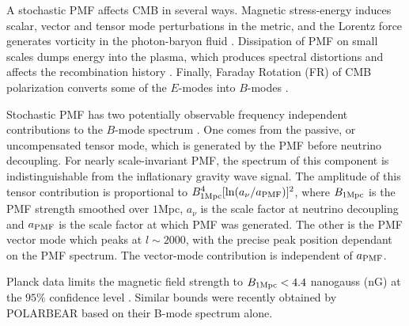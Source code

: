 A stochastic PMF affects CMB in several ways. Magnetic stress-energy induces scalar, vector and tensor mode perturbations in the metric, and the Lorentz force generates vorticity in the photon-baryon fluid \cite{Subramanian:1998fn,Mack:2001gc,Lewis:2004ef,Shaw:2009nf,Paoletti:2010rx}. Dissipation of PMF on small scales dumps energy into the plasma, which produces spectral distortions and affects the recombination history \cite{Kunze:2014eka}.  Finally, Faraday Rotation (FR) of CMB polarization converts some of the $E$-modes into $B$-modes \cite{Kosowsky:2004zh,Pogosian:2011qv}.

Stochastic PMF has two potentially observable frequency independent contributions to the $B$-mode spectrum \cite{Shaw:2009nf}. One comes from the passive, or uncompensated tensor mode, which is generated by the PMF before neutrino decoupling. For nearly scale-invariant PMF, the spectrum of this component is indistinguishable from the inflationary gravity wave signal. The amplitude of this tensor contribution is proportional to $B^4_{1\rm{Mpc}} [\ln(a_\nu / a_{\rm{PMF}})]^2$, where $B_{1\rm{Mpc}}$ is the PMF strength smoothed over $1$Mpc, $a_\nu$ is the scale factor at neutrino decoupling and $a_{\rm{PMF}}$ is the scale factor at which PMF was generated. The other is the PMF vector mode which peaks at $l \sim 2000$, with the precise peak position dependant on the PMF spectrum. The vector-mode contribution is independent of $a_{\rm{PMF}}$. 

Planck data limits the magnetic field strength to $B_{1 {\rm Mpc}}<4.4$ nanogauss (nG) at the $95\%$ confidence level \cite{Ade:2015cva}. Similar bounds were recently obtained by POLARBEAR \cite{Ade:2015cao} based on their B-mode spectrum alone.




